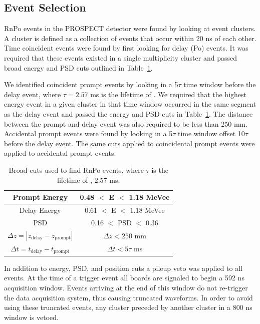 \subsection{Event Selection}

RnPo events in the PROSPECT detector were found by looking at event clusters.
A cluster is defined as a collection of events that occur within 20 ns of each other.
Time coincident events were found by first looking for delay (Po) events. 
It was required that these events existed in a single multiplicity cluster and passed broad energy and PSD cuts outlined in Table~\ref{tab:RnPoCuts}.

We identified coincident prompt events by looking in a 5$\tau$ time window before the delay event, where $\tau = 2.57$ ms is the lifetime of \Po.
We required that the highest energy event in a given cluster in that time window occurred in the same segment as the delay event and passed the energy and PSD cuts in Table~\ref{tab:RnPoCuts}.
The distance between the prompt and delay event was also required to be less than 250 mm. 
Accidental prompt events were found by looking in a 5$\tau$ time window offset 10$\tau$ before the delay event. 
The same cuts applied to coincidental prompt events were applied to accidental prompt events.

\begin{table}[!t]
	\centering
\begin{tabular}{c|c}
	\hline 
	Prompt Energy & 0.48 $<$ E $<$ 1.18 MeVee \\ 
	\hline 
	Delay Energy & 0.61 $<$ E $<$ 1.18 MeVee \\ 
	\hline 
	PSD & 0.16 $<$ PSD $<$ 0.36 \\ 
	\hline 
	$\Delta z = |z_{\textrm{delay}} - z_{\textrm{prompt}}|$ & $\Delta z < 250$ mm  \\ 
	\hline 
	$\Delta t = t_{\textrm{delay}} - t_{\textrm{prompt}}$ & $\Delta t < 5\tau$ ms \\ 
	\hline 
\end{tabular} 
\caption{Broad cuts used to find RnPo events, where $\tau$ is the lifetime of \Po, 2.57 ms.}
\label{tab:RnPoCuts}
\end{table}

In addition to energy, PSD, and position cuts a pileup veto was applied to all events.
At the time of a trigger event all boards are signaled to begin a 592 ns acquisition window. 
Events arriving at the end of this window do not re-trigger the data acquisition system, thus causing truncated waveforms.
In order to avoid using these truncated events, any cluster preceded by another cluster in a 800 ns window is vetoed. 

